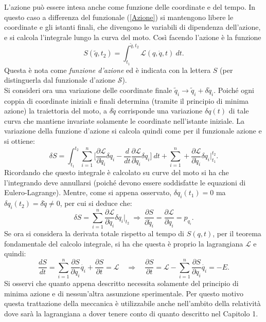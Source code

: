 L'azione può essere intesa anche come funzione delle coordinate e del tempo. In questo caso a differenza del funzionale (\ref{Azione}) si mantengono libere le coordinate e gli istanti finali, che divengono le variabili di dipendenza dell'azione, e si calcola l'integrale lungo la curva del moto. Così facendo l'azione è la funzione
\begin{equation}
    S (\tilde q,t_2)=\int_{t_1}^{\tilde q,t_2} \mathcal{L} (q,\dot q,t)\ dt.
\end{equation}
Questa è nota come \emph{funzione d'azione} ed è indicata con la lettera $S$ (per distinguerla dal funzionale d'azione $\mathcal{S} $).\\
Si consideri ora una variazione delle coordinate finale $\tilde q_i\rightarrow \tilde q_i+\delta \tilde q_i$. Poiché ogni coppia di coordinate iniziali e finali determina (tramite il principio di minima azione) la traiettoria del moto, a $\delta \tilde q$ corrisponde una variazione $\delta q(t)$ di tale curva che mantiene invariate solamente le coordinate nell'istante iniziale. La variazione della funzione d'azione si calcola quindi come per il funzionale azione e si ottiene:
\begin{equation*}
    \delta S=\int_{t_1}^{t_2}\sum_{i=1}^{n}\bigg[\frac{\partial\mathcal{L} }{\partial \dot  q_i}\delta q_i-\frac{d}{dt}\frac{\partial\mathcal{L} }{\partial \dot{q}_i}\delta q_i \bigg]\ dt+\sum_{i=1}^n+\frac{\partial\mathcal{L} }{\partial \dot q_i}\delta q_i\bigg|_{t_1}^{t_2}.
\end{equation*}
Ricordando che questo integrale è calcolato su curve del moto si ha che l'integrando deve annullarsi (poiché devono essere soddisfatte le equazioni di Eulero-Lagrange). Mentre, come si appena osservato, $\delta q_i(t_1)=0$ ma $\delta q_i(t_2)=\delta \tilde q\neq0$, per cui si deduce che:
\begin{equation*}
    \delta S=\sum_{i=1}^n\frac{\partial\mathcal{L} }{\partial \dot q_i}\delta q_i\bigg|_{t_2}\ \Rightarrow\ \frac{\partial S}{\partial \tilde q_i}= \frac{\partial\mathcal{L} }{\partial \dot q_i}=p_{q_i}.
\end{equation*}
Se ora si considera la derivata totale rispetto al tempo di $S(q,t)$, per il teorema fondamentale del calcolo integrale, si ha che questa è proprio la lagrangiana $\mathcal{L} $ e quindi:
\begin{equation*}
    \frac{dS}{dt}=\sum_{i=1}^n\frac{\partial S }{\partial  q_i}\dot{q_i}+\frac{\partial S }{\partial t}=\mathcal{L}\quad \Rightarrow\quad \frac{\partial S }{\partial t}=\mathcal{L} -\sum_{i=1}^n\frac{\partial S }{\partial  q_i}\dot{q_i}=-E.
\end{equation*} 
Si osservi che quanto appena descritto necessita solamente del principio di minima azione e di nessun'altra assunzione sperimentale. Per questo motivo questa trattazione della meccanica è utilizzabile anche nell'ambito della relatività dove sarà la lagrangiana a dover tenere conto di quanto descritto nel Capitolo 1.